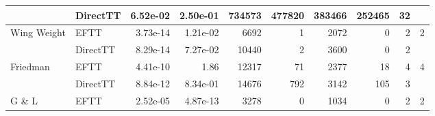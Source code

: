 \begin{table}[!ht]
{\begin{tabular}{llrrrrrrrr}
                                           & DirectTT                        & 6.52e-02                    & 2.50e-01                                           & 734573                         & 477820                                              & 383466                        & 252465                                           & 32                                       & {}                                       \\ \hline
            \multirow{2}{*}{Wing Weight}   & EFTT                            & 3.73e-14                    & 1.21e-02                                           & 6692                           & 1                                                   & 2072                          & 0                                                & 2                                        & {2}                                      \\ %
                                           & DirectTT                        & 8.29e-14                    & 7.27e-02                                           & 10440                          & 2                                                   & 3600                          & 0                                                & 2                                        & {}                                       \\ \hline
            \multirow{2}{*}{Friedman}      & EFTT                            & 4.41e-10                    & 1.86                                               & 12317                          & 71                                                  & 2377                          & 18                                               & 4                                        & {4}                                      \\ %
                                           & DirectTT                        & 8.84e-12                    & 8.34e-01                                           & 14676                          & 792                                                 & 3142                          & 105                                              & 3                                        & {}                                       \\ \hline
            \multirow{2}{*}{G \& L}        & EFTT                            & 2.52e-05                    & 4.87e-13                                           & 3278                           & 0                                                   & 1034                          & 0                                                & 2                                        & {2}                                      \\ %

\end{tabular}}
\end{table}

